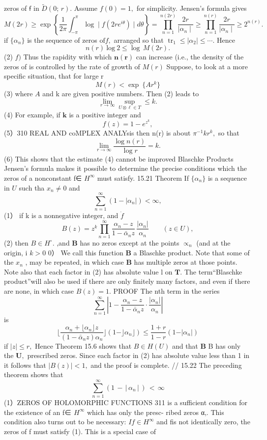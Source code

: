 zeros of $\boldsymbol{\mathsf{f}}$ in ${\tilde{D}}(0;\,r).$ Assume $f(0)=1,$ for simplicity. Jensen's formula gives $$ M(2r)\geq\exp\left\{{\frac{1}{2\pi}}\int_{-\pi}^{\pi}\log\mid f(2r e^{i\theta})\mid d\theta\right\}=\prod_{n=1}^{n(2r)}{\frac{2r}{\mid\alpha_{n}\mid}}\geq\prod_{n=1}^{n(r)}{\frac{2r}{\mid\alpha_{n}\mid}}\geq2^{n(r)}. $$ if $\{\alpha_{n}\}$ is the sequence of zeros ${\mathrm{of}}f,$ arranged so that $\operatorname{tr}_{1}\leq|\alpha_{2}|\leq\cdots.$ Hence $$ n(r)\ \mathrm{log}\ 2\leq\log\,M(2r). $$ (2) $f)$ Thus the rapidity with which ${\boldsymbol{n}}({\boldsymbol{r}})$ can increase (i.e., the density of the zeros of is controlled by the rate of growth of $\scriptstyle M(r)$ Suppose, to look at a more specific situation, that for large r $$ M(r)<\exp\:\{A r^{k}\} $$ (3) where $\scriptstyle A$ and k are given positive numbers. Then (2) leads to $$ \operatorname*{lim}_{r\to\infty}\operatorname*{sup}_{U\otimes\ell\in T}{\leq k}. $$ (4) For example, if $\boldsymbol{k}$ is a positive integer and $$ f(z)=1-e^{z^{k}}, $$ (5）310 REAL AND coMPLEX ANALYsis then n(r) is about $\pi^{-1}k r^{k},$ so that $$ \operatorname*{lim}_{r\to\infty}{\frac{\log{n(r)}}{\log r}}=k. $$ (6) This shows that the estimate (4) cannot be improved Blaschke Products Jensen's formula makes it possible to determine the precise conditions which the zeros of a nonconstant f∈ $H^{\infty}$ must satisfy. 15.21 Theorem If $\{\alpha_{n}\}$ is a sequence in $U$ such tha $x_{n}\neq0$ and $$ \sum_{n=1}^{\infty}(1-|\alpha_{n}|)<\infty, $$ (1） if k is a nonnegative integer, and $\dot{f}$ $$ B(z)=z^{k}\prod_{n=1}^{\infty}{\frac{\alpha_{n}-z}{1-{\bar{\alpha}}_{n}z}}\,{\frac{|\alpha_{n}|}{\alpha_{n}}}\qquad(z\in U), $$ (2) then $B\in H^{\circ}.$ ,and $\boldsymbol{B}$ has no zeros except at the points $\propto_{n}$ (and at the origin, i $k>0$ 0） We call this function $\boldsymbol{B}$ a Blaschke product. Note that some of the $\textstyle x_{n}$ , may be repeated, in which case $\boldsymbol{B}$ has multiple zeros at those points. Note also that each factor in (2) has absolute value l on ${\boldsymbol{T}}.$ The term“Blaschke product”will also be used if there are only finitely many factors, and even if there are none, in which case $B(z)=1.$ PROOF The nth term in the series $$ \sum_{n=1}^{\infty}\left|1-{\frac{\alpha_{n}-z}{1-{\bar{\alpha}}_{n}z}}\cdot{\frac{|\alpha_{n}|}{\alpha_{n}}}\right| $$ is $$ \lfloor{\frac{\alpha_{n}+\lfloor\alpha_{n}\rfloor z}{(1-\bar{\alpha}_{n}z)\alpha_{n}}} \rfloor(1-\rfloor\alpha_{n}\rfloor)\leq{\frac{1+r}{1-r}}\left(1-\vert\alpha_{n}\vert\right) $$ if $|z|\leq r,$ Hence Theorem 15.6 shows that $B\in H(U)$ and that $\boldsymbol{B}$ B has only the ${\boldsymbol{U}},$ prescribed zeros. Since each factor in (2) has absolute value less than 1 in it follows that $|B(z)|<1,$ and the proof is complete. // 15.22 The preceding theorem shows that $$ \sum_{n=1}^{\infty}\left(1\,-\,\left|\,\alpha_{n}\,\right|\,\right)\,<\,\infty $$ (1）ZEROS OF HOLOMORPHIC FUNCTIONS 311 is a sufficient condition for the existence of an f∈ $H^{\infty}$ which has only the presc- ribed zeros {α,}. This condition also turns out to be necessary: $I f\in H^{\infty}$ and fis not identically zero, the zeros of f must satisfy (1). This is a special case of 